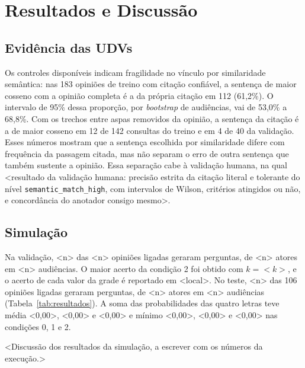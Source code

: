 \section{Resultados e Discuss\~ao}
\label{sec:resultados}

\subsection{Evidência das UDVs}
\label{sec:resultados-udv}

Os controles disponíveis indicam fragilidade no vínculo por similaridade semântica: nas 183 opiniões
de treino com citação confiável, a sentença de maior cosseno com a opinião completa é a da própria
citação em 112 (61,2\%). O intervalo de 95\% dessa proporção, por \textit{bootstrap} de audiências,
vai de 53,0\% a 68,8\%. Com os trechos entre aspas removidos da opinião, a sentença da citação é a
de maior cosseno em 12 de 142 consultas do treino e em 4 de 40 da validação. Esses números mostram
que a sentença escolhida por similaridade difere com frequência da passagem citada, mas não separam
o erro de outra sentença que também sustente a opinião. Essa separação cabe à validação humana, na
qual <resultado da validação humana: precisão estrita da citação literal e tolerante do nível
\texttt{semantic\_match\_high}, com intervalos de Wilson, critérios atingidos ou não, e concordância
do anotador consigo mesmo>.

\subsection{Simulação}
\label{sec:resultados-simulacao}



Na validação, <n> das <n> opiniões ligadas geraram perguntas, de <n> atores em <n> audiências. O
maior acerto da condição 2 foi obtido com $k = {<}k{>}$, e o acerto de cada valor da grade é
reportado em <local>. No teste, <n> das 106 opiniões ligadas
geraram perguntas, de <n> atores em <n> audiências (Tabela~\ref{tab:resultados}). A soma das
probabilidades das quatro letras teve média <0,00>, <0,00> e <0,00> e mínimo <0,00>, <0,00> e
<0,00> nas condições 0, 1 e 2.

<Discussão dos resultados da simulação, a escrever com os números da execução.>


